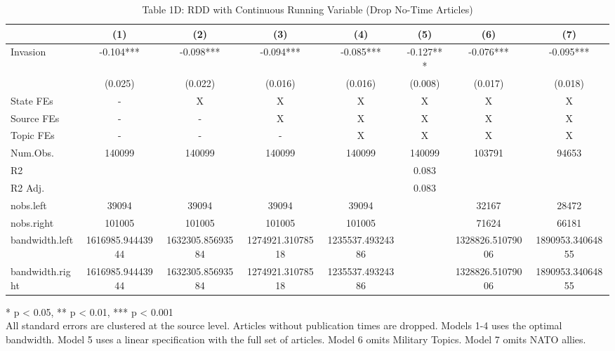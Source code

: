 \begin{table}[!t]
\caption{Table 1D: RDD with Continuous Running Variable (Drop No-Time Articles)} 
\fontsize{12.0pt}{14.4pt}\selectfont
\begin{tabular*}{\linewidth}{@{\extracolsep{\fill}}lccccccc}
\toprule
  & (1) & (2) & (3) & (4) & (5) & (6) & (7) \\ 
\midrule\addlinespace[2.5pt]
Invasion & -0.104*** & -0.098*** & -0.094*** & -0.085*** & -0.127*** & -0.076*** & -0.095*** \\ 
{} & {(0.025)} & {(0.022)} & {(0.016)} & {(0.016)} & {(0.008)} & {(0.017)} & {(0.018)} \\ 
State FEs & - & X & X & X & X & X & X \\ 
Source FEs & - & - & X & X & X & X & X \\ 
Topic FEs & - & - & - & X & X & X & X \\ 
Num.Obs. & 140099 & 140099 & 140099 & 140099 & 140099 & 103791 & 94653 \\ 
R2 &  &  &  &  & 0.083 &  &  \\ 
R2 Adj. &  &  &  &  & 0.083 &  &  \\ 
nobs.left & 39094 & 39094 & 39094 & 39094 &  & 32167 & 28472 \\ 
nobs.right & 101005 & 101005 & 101005 & 101005 &  & 71624 & 66181 \\ 
bandwidth.left & 1616985.94443944 & 1632305.85693584 & 1274921.31078518 & 1235537.49324386 &  & 1328826.51079006 & 1890953.34064855 \\ 
bandwidth.right & 1616985.94443944 & 1632305.85693584 & 1274921.31078518 & 1235537.49324386 &  & 1328826.51079006 & 1890953.34064855 \\ 
\bottomrule
\end{tabular*}
\begin{minipage}{\linewidth}
* p < 0.05, ** p < 0.01, *** p < 0.001\\
All standard errors are clustered at the source level. Articles without
publication times are dropped. Models 1-4 uses the optimal bandwidth. Model
5 uses a linear specification with the full set of articles. Model 6 omits
Military Topics. Model 7 omits NATO allies.\\
\end{minipage}
\end{table}


